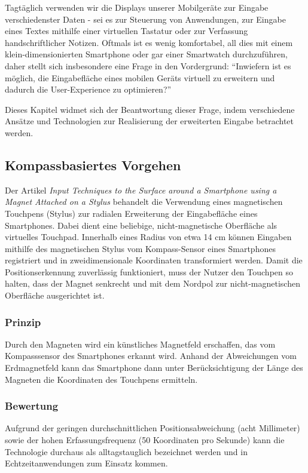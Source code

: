 Tagtäglich verwenden wir die Displays unserer Mobilgeräte zur Eingabe verschiedenster Daten - sei es zur Steuerung von Anwendungen, zur Eingabe eines Textes mithilfe einer virtuellen Tastatur oder zur Verfassung handschriftlicher Notizen. Oftmals ist es wenig komfortabel, all dies mit einem klein-dimensionierten Smartphone oder gar einer Smartwatch durchzuführen, daher stellt sich insbesondere eine Frage in den Vordergrund: \enquote{Inwiefern ist es möglich, die Eingabefläche eines mobilen Geräts virtuell zu erweitern und dadurch die User-Experience zu optimieren?}

Dieses Kapitel widmet sich der Beantwortung dieser Frage, indem verschiedene Ansätze und Technologien zur Realisierung der erweiterten Eingabe betrachtet werden.

\subsection{Kompassbasiertes Vorgehen}

Der Artikel \textit{Input Techniques to the Surface around a Smartphone using a Magnet Attached on a Stylus} \cite{Abe.2015} behandelt die Verwendung eines magnetischen Touchpens (Stylus) zur radialen Erweiterung der Eingabefläche eines Smartphones. Dabei dient eine beliebige, nicht-magnetische Oberfläche als virtuelles Touchpad. Innerhalb eines Radius von etwa 14 cm können Eingaben mithilfe des magnetischen Stylus vom Kompass-Sensor eines Smartphones registriert und in zweidimensionale Koordinaten transformiert werden. Damit die Positionserkennung zuverlässig funktioniert, muss der Nutzer den Touchpen so halten, dass der Magnet senkrecht und mit dem Nordpol zur nicht-magnetischen Oberfläche ausgerichtet ist.

\subsubsection{Prinzip}
Durch den Magneten wird ein künstliches Magnetfeld erschaffen, das vom Kompasssensor des Smartphones erkannt wird. Anhand der Abweichungen vom Erdmagnetfeld kann das Smartphone dann unter Berücksichtigung der Länge des Magneten die Koordinaten des Touchpens ermitteln.

\subsubsection{Bewertung}
Aufgrund der geringen durchschnittlichen Positionsabweichung (acht Millimeter) sowie der hohen Erfassungsfrequenz (50 Koordinaten pro Sekunde) kann die Technologie durchaus als alltagstauglich bezeichnet werden und in Echtzeitanwendungen zum Einsatz kommen.

